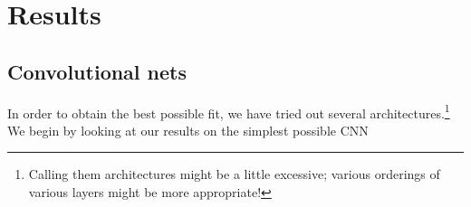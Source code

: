 \documentclass[]{article}
\begin{document}
\section{Results}

\subsection{Convolutional nets}
In order to obtain the best possible fit, we have tried out several architectures.\footnote{Calling them architectures might be a little excessive; various orderings of various layers might be more appropriate!} We begin by looking at our results on the simplest possible CNN





\end{document}

